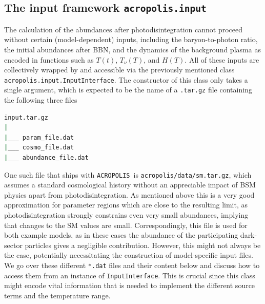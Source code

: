 \documentclass[11pt,a4paper]{article}
\newcommand{\acropolis}{\texttt{ACROPOLIS}~}
\begin{document}
\subsection{The input framework \texttt{acropolis.input}}
\label{sec:input}
The calculation of the abundances after photodisintegration cannot proceed without certain (model-dependent) inputs, including the baryon-to-photon ratio, the initial abundances after BBN, and the dynamics of the background plasma as encoded in functions such as $T(t)$, $T_\nu(T)$, and $H(T)$. All of these inputs are collectively wrapped by and accessible via the previously mentioned class \texttt{acropolis.input.InputInterface}. The constructor of this class only takes a single argument, which is expected to be the name of a \texttt{.tar.gz} file containing the following three files
\begin{lstlisting}[language=bash,backgroundcolor=\color{white}]
input.tar.gz
|
|___ param_file.dat
|___ cosmo_file.dat
|___ abundance_file.dat
\end{lstlisting}
One such file that ships with \acropolis is \texttt{acropolis/data/sm.tar.gz}, which assumes a standard cosmological history without an appreciable impact of BSM physics apart from photodisintegration.
As mentioned above this is a very good approximation for parameter regions which are close to the resulting limit, as photodisintegration strongly constrains even very small abundances, implying that changes to the SM values are small. Correspondingly, this file is used for both example models, as in these cases the abundance of the participating dark-sector particles gives a negligible contribution.
However, this might not always be the case, potentially necessitating the construction of model-specific input files.
We go over these different \texttt{*.dat} files and their content below and discuss how to access them from an instance of \texttt{InputInterface}. This is crucial since this class might encode vital information that is needed to implement the different source terms and the temperature range.
\end{document}
